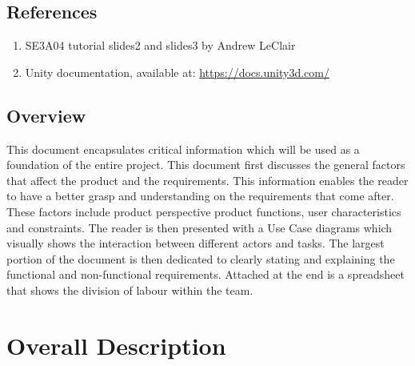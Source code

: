\documentclass[]{article}
\begin{document}
\subsection{References}
\begin{enumerate}
    \item SE3A04 tutorial slides2 and slides3 by Andrew LeClair
    \item Unity documentation, available at: \url{https://docs.unity3d.com/}
\end{enumerate}
\label{sub:references}

\subsection{Overview}
\label{sub:overview}
	This document encapsulates critical information which will be used as a foundation of the entire project. This document first discusses the general factors that affect the product and the requirements. This information enables the reader to have a better grasp and understanding on the requirements that come after. These factors include product perspective product functions, user characteristics and constraints. The reader is then presented with a Use Case diagrams which visually shows the interaction between different actors and tasks. The largest portion of the document is then dedicated to clearly stating and explaining the functional and non-functional requirements. Attached at the end is a spreadsheet that shows the division of labour within the team. 


\section{Overall Description}
\label{sec:overall_description}
\end{document}
